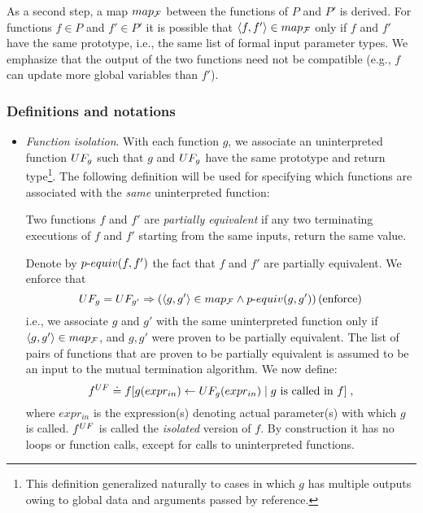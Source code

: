 As a second step, a map $map_{\cal F}$ between the functions of $P$ and $P'$ is
derived. For functions $f \in P$ and $f' \in P'$ it is possible that
$\langle f,f'\rangle \in map_{\cal F}$ only if $f$ and $f'$ have the same prototype, i.e., the
same list of formal input parameter types. We emphasize that the output of the two
functions need not be compatible (e.g., $f$ can update more global variables
than $f'$).

\subsubsection{Definitions and notations}

\begin{itemize}
\item \emph{Function isolation}. With each function $g$, we associate an
    uninterpreted function $UF_{g}$ such that $g$ and $UF_{g}$ have the
    same prototype and return type\footnote{This definition generalized naturally to cases in which $g$ has multiple outputs owing to global data and arguments passed by reference.}. The following definition will be used for specifying which functions are associated with the \emph{same} uninterpreted function:    
    
\begin{definition}
\label{def:pe_prog} Two functions $f$ and $f'$  are \emph{partially
equivalent} if any two terminating executions of $f$ and $f'$ starting from the
same inputs, return the same value.
\end{definition}
Denote by $p\mbox{-}equiv(f,f')$ the fact that $f$ and $f'$ are partially equivalent. We enforce that
\begin{equation}\label{eq:enforcement}
UF_{g} = UF_{g'} \Rightarrow \left(\langle g, g'\rangle \in map_{\cal F} \wedge p\mbox{-}equiv(g, g')\right)  \mbox{(enforce)}
\end{equation}
i.e., we associate $g$ and $g'$ with the same
uninterpreted function only if $\langle g,g'\rangle \in map_{\cal F}$, and $g,g'$ were proven to be partially equivalent. The list of pairs of functions that are proven to be partially equivalent is assumed to be an input to the mutual termination algorithm.
%
We now define:
\begin{equation}\label{eq:isolation}
{f}^{UF} \doteq f[g(expr_{in}) \leftarrow UF_{g}(expr_{in}) \mid g \mbox{ is called in $f$}]\;,
\end{equation}
%
where $expr_{in}$ is the expression(s) denoting actual parameter(s) with which $g$ is called.
$ {f}^{UF}$ is called the \emph{isolated} version of $f$. By construction
it has no loops or function calls, except for calls to uninterpreted functions.


\end{itemize}
